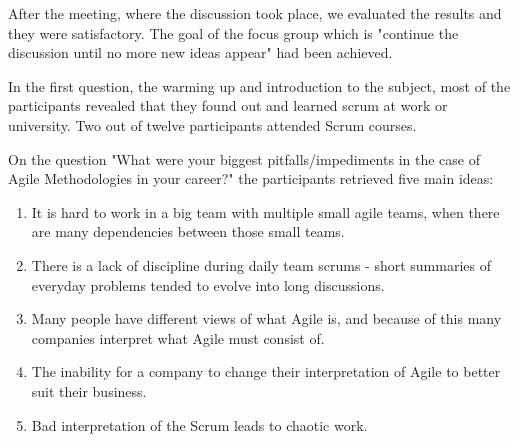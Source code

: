 After the meeting, where the discussion took place, we evaluated the results and they were satisfactory. The goal of the focus group which is "continue the discussion until no more new ideas appear" had been achieved.

In the first question, the warming up and introduction to the subject, most of the participants revealed that they found out and learned scrum at work or university. Two out of twelve participants attended Scrum courses.

On the question "What were your biggest pitfalls/impediments in the case of Agile Methodologies in your career?" the participants retrieved five main ideas:
\begin{enumerate}
    \item It is hard to work in a big team with multiple small agile teams, when there are many dependencies between those small teams.
    \item There is a lack of discipline during daily team scrums - short summaries of everyday problems tended to evolve into long discussions.
    \item Many people have different views of what Agile is, and because of this many companies interpret what Agile must consist of. 
    \item The inability for a company to change their interpretation of Agile to better suit their business.
    \item Bad interpretation of the Scrum leads to chaotic work.
\end{enumerate}

